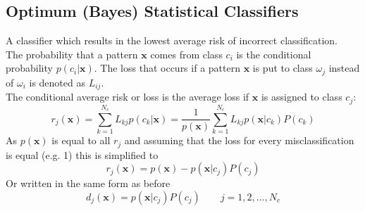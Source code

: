 \subsection{Optimum (Bayes) Statistical Classifiers}
A classifier which results in the lowest average risk of incorrect classification. \\

The probability that a pattern $\mathbf{x}$ comes from class $c_i$ is the conditional probability $p(c_i | \mathbf{x})$.
The loss that occurs if a pattern $\mathbf{x}$ is put to class $\omega_j$ instead of $\omega_i$ is denoted as $L_{ij}$. \\

The conditional average risk or loss is the average loss if $\mathbf{x}$ is assigned to class $c_j$:
	\[
		r_j(\mathbf{x}) = \sum\limits_{k=1}^{N_c} L_{kj} p(c_k | \mathbf{x}) = \frac{1}{p(\mathbf{x})} \sum\limits_{k=1}^{N_c} L_{kj} p(\mathbf{x} | c_k) P(c_k)
	\]
As $p(\mathbf{x})$ is equal to all $r_j$ and assuming that the loss for every misclassification is equal (e.g. 1) this is simplified to
	\[
		r_j(\mathbf{x}) = p(\mathbf{x}) - p(\mathbf{x} | c_j) P(c_j)
	\]
Or written in the same form as before
	\[
		d_j(\mathbf{x}) = p(\mathbf{x} | c_j) P(c_j)	\qquad j=1,2,\ldots,N_c
	\]

